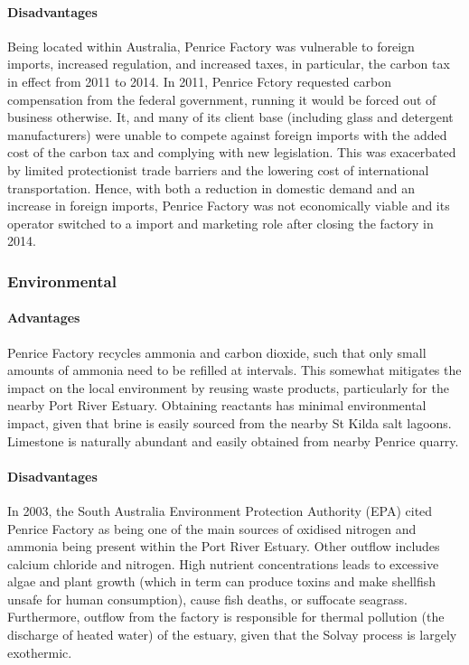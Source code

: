 \documentclass[12pt, a4paper]{article}
\begin{document}
\paragraph{Disadvantages}

Being located within Australia, Penrice Factory was vulnerable to foreign imports, increased regulation, and increased taxes, in particular, the carbon tax in effect from 2011 to 2014. In 2011, Penrice Fctory requested carbon compensation from the federal government, running it would be forced out of business otherwise. It, and many of its client base (including glass and detergent manufacturers) were unable to compete against foreign imports with the added cost of the carbon tax and complying with new legislation. This was exacerbated by limited protectionist trade barriers and the lowering cost of international transportation. Hence, with both a reduction in domestic demand and an increase in foreign imports, Penrice Factory was not economically viable and its operator switched to a import and marketing role after closing the factory in 2014.

\subsubsection{Environmental}

\paragraph{Advantages}
Penrice Factory recycles ammonia and carbon dioxide, such that only small amounts of ammonia need to be refilled at intervals. This somewhat mitigates the impact on the local environment by reusing waste products, particularly for the nearby Port River Estuary. Obtaining reactants has minimal environmental impact, given that brine is easily sourced from the nearby St Kilda salt lagoons. Limestone is naturally abundant and easily obtained from nearby Penrice quarry.

\paragraph{Disadvantages}
In 2003, the South Australia Environment Protection Authority (EPA) cited Penrice Factory as being one of the main sources of oxidised nitrogen and ammonia being present within the Port River Estuary. Other outflow includes calcium chloride and nitrogen. High nutrient concentrations leads to excessive algae and plant growth (which in term can produce toxins and make shellfish unsafe for human consumption), cause fish deaths, or suffocate seagrass. Furthermore, outflow from the factory is responsible for thermal pollution (the discharge of heated water) of the estuary, given that the Solvay process is largely exothermic. 
\end{document}
